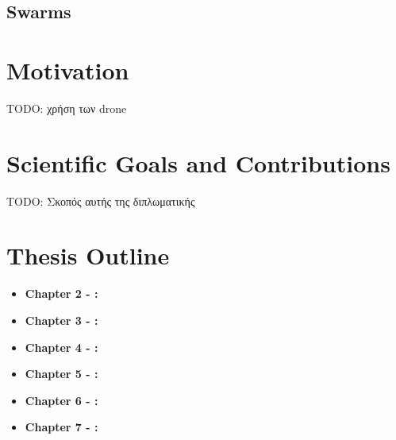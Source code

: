 \subsection{Swarms} \label{sec:Chapter1-1-2}


\section{Motivation} \label{sec:Chapter1-2} 

TODO: χρήση των drone

\section{Scientific Goals and Contributions} \label{sec:Chapter1-3} 
TODO: Σκοπός αυτής της διπλωματικής

\section{Thesis Outline} \label{sec:Chapter1-4} 

    \begin{itemize}
        \item \textbf{Chapter 2 - {\hypersetup{hidelinks}}:}
        \item \textbf{Chapter 3 - {\hypersetup{hidelinks}}:}
        \item \textbf{Chapter 4 - {\hypersetup{hidelinks}}:}                %
        \item \textbf{Chapter 5 - {\hypersetup{hidelinks}}:}       %
        \item \textbf{Chapter 6 - {\hypersetup{hidelinks}}:}
        \item \textbf{Chapter 7 - {\hypersetup{hidelinks}}:}
    \end{itemize}
